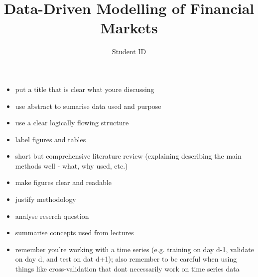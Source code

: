 \documentclass[a4paper, 11pt]{article}
\title{Data-Driven Modelling of Financial Markets}
\author{Student ID}
\date{}
\begin{document}
    \maketitle

    \begin{itemize}
        \item put a title that is clear what youre discussing
        \item use abstract to sumarise data used and purpose
        \item use a clear logically flowing structure
        \item label figures and tables
        \item short but comprehensive literature review (explaining describing the main methods well - what, why used, etc.)
        \item make figures clear and readable
        \\
        \item justify methodology
        \item analyse reserch question
        \item summarise concepts used from lectures
        \\
        \item remember you're working with a time series (e.g. training on day d-1, validate on day d, and test on dat d+1); also remember to be careful when using things like cross-validation that dont necessarily work on time series data
        
    \end{itemize}

    \centering
\end{document}
